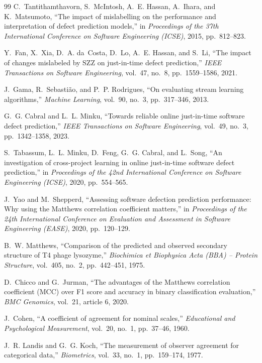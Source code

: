\documentclass[12pt,a4paper,oneside]{report}
\begin{document}
{\begin{thebibliography}{99}
C.~Tantithamthavorn, S.~McIntosh, A.~E. Hassan, A.~Ihara, and K.~Matsumoto,
``The impact of mislabelling on the performance and interpretation of defect
prediction models,'' in \emph{Proceedings of the 37th International Conference
on Software Engineering (ICSE)}, 2015, pp.~812--823.

Y.~Fan, X.~Xia, D.~A. da~Costa, D.~Lo, A.~E. Hassan, and S.~Li, ``The impact of
changes mislabeled by SZZ on just-in-time defect prediction,'' \emph{IEEE
Transactions on Software Engineering}, vol.~47, no.~8, pp.~1559--1586, 2021.

J.~Gama, R.~Sebasti\~{a}o, and P.~P. Rodrigues, ``On evaluating stream learning
algorithms,'' \emph{Machine Learning}, vol.~90, no.~3, pp.~317--346, 2013.

G.~G. Cabral and L.~L. Minku, ``Towards reliable online just-in-time software
defect prediction,'' \emph{IEEE Transactions on Software Engineering}, vol.~49,
no.~3, pp.~1342--1358, 2023.

S.~Tabassum, L.~L. Minku, D.~Feng, G.~G. Cabral, and L.~Song, ``An
investigation of cross-project learning in online just-in-time software defect
prediction,'' in \emph{Proceedings of the 42nd International Conference on
Software Engineering (ICSE)}, 2020, pp.~554--565.

J.~Yao and M.~Shepperd, ``Assessing software defection prediction performance:
Why using the Matthews correlation coefficient matters,'' in \emph{Proceedings
of the 24th International Conference on Evaluation and Assessment in Software
Engineering (EASE)}, 2020, pp.~120--129.

B.~W. Matthews, ``Comparison of the predicted and observed secondary structure
of T4 phage lysozyme,'' \emph{Biochimica et Biophysica Acta (BBA) -- Protein
Structure}, vol.~405, no.~2, pp.~442--451, 1975.

D.~Chicco and G.~Jurman, ``The advantages of the Matthews correlation
coefficient (MCC) over F1 score and accuracy in binary classification
evaluation,'' \emph{BMC Genomics}, vol.~21, article 6, 2020.

J.~Cohen, ``A coefficient of agreement for nominal scales,'' \emph{Educational
and Psychological Measurement}, vol.~20, no.~1, pp.~37--46, 1960.

J.~R. Landis and G.~G. Koch, ``The measurement of observer agreement for
categorical data,'' \emph{Biometrics}, vol.~33, no.~1, pp.~159--174, 1977.


\end{thebibliography}}
\end{document}
